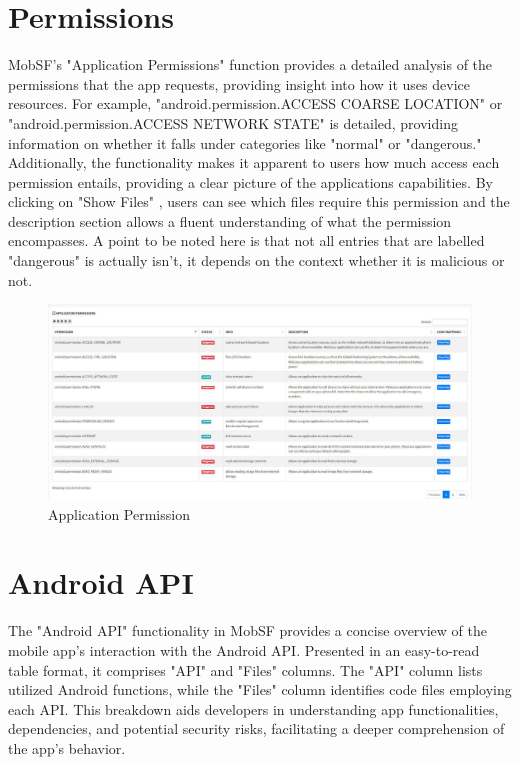 \documentclass{report}
\begin{document}
\section{Permissions}
MobSF's "Application Permissions" function provides a detailed analysis of the permissions that the app requests, providing insight into how it uses device resources. For example, "android.permission.ACCESS COARSE LOCATION" or "android.permission.ACCESS NETWORK STATE" is detailed, providing information on whether
it falls under categories like "normal" or "dangerous."  Additionally, the functionality makes it apparent to users how much access each permission entails, providing a clear picture of the applications capabilities.  
By clicking on "Show Files" , users can see which files require this permission and the description section allows a fluent understanding of what the permission encompasses. A point to be noted here is that not all entries that are labelled "dangerous" is actually isn't, it depends on the context whether it is malicious or not.

\begin{figure}[hbt!]
        \centering
        \includegraphics[width=1\textwidth]{images/permisssions.jpg}
        \caption{Application Permission}
        \label{fig:example}
\end{figure}

\FloatBarrier

\section{Android API}

The "Android API" functionality in MobSF provides a concise overview of the mobile app's interaction with the Android API. Presented in an easy-to-read table format, it comprises "API" and "Files" columns. The "API" column lists utilized Android functions, while the "Files" column identifies code files employing each API. This breakdown aids developers in understanding app functionalities, dependencies, and potential security risks, facilitating a deeper comprehension of the app's behavior.
\end{document}

